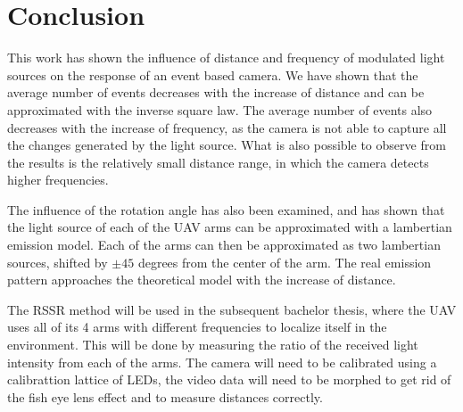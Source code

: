 
\chapter{Conclusion\label{chap:conclusion}}

This work has shown the influence of distance and frequency of modulated light sources on the response of an event based camera.
We have shown that the average number of events decreases with the increase of distance and can be approximated with
the inverse square law. The average number of events also decreases with the increase of frequency, as the camera is not
able to capture all the changes generated by the light source. What is also possible to observe from the results is the relatively
small distance range, in which the camera detects higher frequencies.

The influence of the rotation angle has also been examined, and has shown that the light source of each of the UAV arms can be
approximated with a lambertian emission model. Each of the arms can then be approximated as two lambertian sources, shifted
by $\pm 45$ degrees from the center of the arm. The real emission pattern approaches the theoretical model with the increase
of distance.

The RSSR method will be used in the subsequent bachelor thesis, where the UAV uses all of its 4 arms with different frequencies
to localize itself in the environment. This will be done by measuring the ratio of the received light intensity from each of the
arms. The camera will need to be calibrated using a calibrattion lattice of LEDs, the video data will need to be morphed
to get rid of the fish eye lens effect and to measure distances correctly.